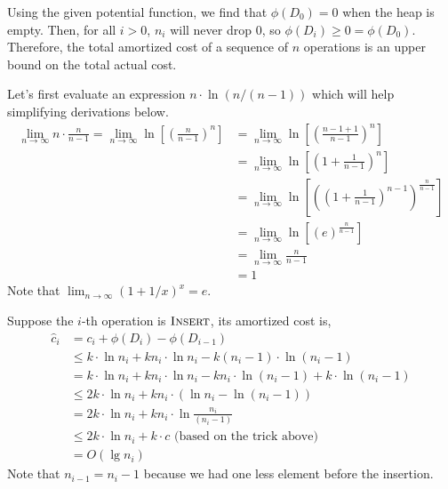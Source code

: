 \documentclass[11pt]{article}
\theoremstyle{definition}
\theoremstyle{theorem}
\newcommand{\solution}{\medskip\noindent{\color{DarkBlue}\textbf{Solution:}}}
\begin{document}
\solution

Using the given potential function, we find that $\phi(D_0) = 0$ when the heap is empty. Then, for all $i > 0$, $n_i$ will never drop 0, so $\phi(D_i) \ge 0 = \phi(D_0)$. Therefore, the total amortized cost of a sequence of $n$ operations is an upper bound on the total actual cost.

Let's first evaluate an expression $n \cdot \ln (n/(n-1))$ which will help simplifying derivations below. 
\[
\begin{split}
\lim_{n \to \infty} n \cdot \frac{n}{n-1} = \lim_{n \to \infty} \ln \left[ (\frac{n}{n-1})^n \right] &= \lim_{n \to \infty} \ln \left[ (\frac{n-1+1}{n-1})^n \right] \\
&= \lim_{n \to \infty} \ln \left[ (1 + \frac{1}{n-1})^n \right] \\
&= \lim_{n \to \infty} \ln \left[ \left( (1 + \frac{1}{n-1})^{n-1} \right)^{\frac{n}{n-1}}  \right] \\
&= \lim_{n \to \infty} \ln \left[ \left( e \right)^{\frac{n}{n-1}}  \right] \\
&= \lim_{n \to \infty} \frac{n}{n-1} \\
&= 1
\end{split}
\]
Note that $\lim_{n \to \infty} (1 + 1/x)^{x} = e$.

Suppose the $i$-th operation is $\textproc{\textsc{Insert}}$, its amortized cost is,
\[
\begin{split}
\hat{c}_i &= c_i + \phi(D_i) - \phi(D_{i-1}) \\
& \le k \cdot \ln n_i +  k n_i \cdot \ln n_i - k (n_i - 1) \cdot \ln (n_i - 1) \\
& = k \cdot \ln n_i +  k n_i \cdot \ln n_i - k n_i \cdot \ln (n_i - 1) + k \cdot \ln (n_i - 1) \\
& \le 2k \cdot \ln n_i  + k n_i \cdot (\ln n_i - \ln (n_i - 1)) \\
& = 2k \cdot \ln n_i  + k n_i \cdot \ln \frac{n_i}{(n_i - 1)} \\
& \le 2k \cdot \ln n_i  + k \cdot c \text{ (based on the trick above) } \\
& = O(\lg n_i)
\end{split}
\]
Note that $n_{i-1} = n_i - 1$ because we had one less element before the insertion.
\end{document}
